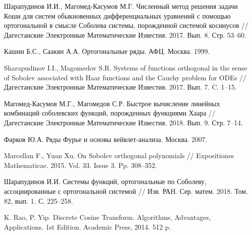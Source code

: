 \begin{thebibliography}{111}
Шарапудинов И.И., Магомед-Касумов М.Г. Численный метод решения задачи Коши для систем обыкновенных дифференциальных уравнений с помощью ортогональной в смысле Соболева системы, порожденной системой косинусов // Дагестанские Электронные Математические Известия. 2017. Вып. 8. Стр. 53--60.

Кашин Б.С., Саакян А.А. Ортогональные ряды. АФЦ. Москва. 1999.

Sharapudinov I.I., Magomedov S.R. Systems of functions orthogonal in the sense of Sobolev associated with Haar functions and the Cauchy problem for ODEs // Дагестанские Электронные Математические Известия. 2017. Вып. 7. C. 1--15.

Магомед-Касумов М.Г., Магомедов С.Р. Быстрое вычисление линейных комбинаций соболевских функций, порожденных функциями Хаара // Дагестанские Электронные Математические Известия. 2018. Вып. 9. Стр. 7--14.

Фарков Ю.А. Ряды Фурье и основы вейвлет-анализа. Москва. 2007.


 Marcellan F., Yuan Xu. On Sobolev orthogonal polynomials // Expositiones Mathematicae. 2015. Vol. 33. Issue 3. Pp. 308--352.

Шарапудинов И.И. Системы функций, ортогональные по Соболеву, ассоциированные с ортогональной системой // Изв. РАН. Сер. матем. 2018. Том. 82, вып. 1. С. 225--258.

K. Rao, P. Yip. Discrete Cosine Transform. Algorithms, Advantages, Applications. 1st Edition. Academic Press, 2014. 512 p.

\end{thebibliography}
